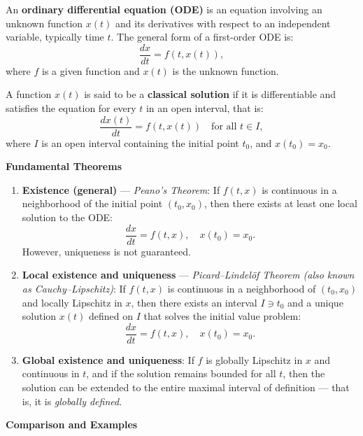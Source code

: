 
An \textbf{ordinary differential equation (ODE)} is an equation involving an unknown function \( x(t) \) and its derivatives with respect to an independent variable, typically time \( t \). The general form of a first-order ODE is:
\[
\frac{dx}{dt} = f(t, x(t)),
\]
where \( f \) is a given function and \( x(t) \) is the unknown function.

A function \( x(t) \) is said to be a \textbf{classical solution} if it is differentiable and satisfies the equation for every \( t \) in an open interval, that is:
\[
\frac{dx(t)}{dt} = f(t, x(t)) \quad \text{for all } t \in I,
\]
where \( I \) is an open interval containing the initial point \( t_0 \), and \( x(t_0) = x_0 \).

\vspace{1em}
\noindent
\textbf{Fundamental Theorems}

\begin{enumerate}
    \item \textbf{Existence (general)} — \emph{Peano’s Theorem}:  
    If \( f(t, x) \) is continuous in a neighborhood of the initial point \( (t_0, x_0) \), then there exists at least one local solution to the ODE:
    \[
    \frac{dx}{dt} = f(t,x), \quad x(t_0) = x_0.
    \]
    However, uniqueness is not guaranteed.

    \item \textbf{Local existence and uniqueness} — \emph{Picard–Lindelöf Theorem (also known as Cauchy–Lipschitz)}:  
    If \( f(t,x) \) is continuous in a neighborhood of \( (t_0, x_0) \) and locally Lipschitz in \( x \), then there exists an interval \( I \ni t_0 \) and a unique solution \( x(t) \) defined on \( I \) that solves the initial value problem:
    \[
    \frac{dx}{dt} = f(t,x), \quad x(t_0) = x_0.
    \]

    \item \textbf{Global existence and uniqueness}:  
    If \( f \) is globally Lipschitz in \( x \) and continuous in \( t \), and if the solution remains bounded for all \( t \), then the solution can be extended to the entire maximal interval of definition — that is, it is \emph{globally defined}.
\end{enumerate}

\vspace{1em}
\noindent
\textbf{Comparison and Examples}

